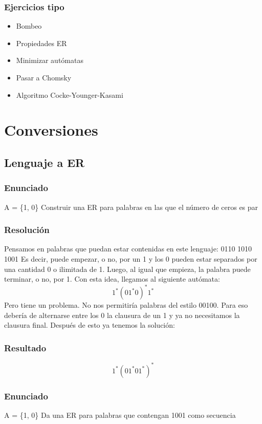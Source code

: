 \documentclass[12pt]{article}
\begin{document}
\subsubsection{Ejercicios tipo}
\begin{itemize}
    \item Bombeo
    \item Propiedades ER 
    \item Minimizar autómatas
    \item Pasar a Chomsky 
    \item Algoritmo Cocke-Younger-Kasami    
\end{itemize}
\newpage
\section{Conversiones}
\subsection{Lenguaje a ER}
\subsubsection{Enunciado}
A = \{1, 0\}
\newline
Construir una ER para palabras en las que el número de ceros es par
\subsubsection{Resolución}
Pensamos en palabras que puedan estar contenidas en este lenguaje: 
 0110 1010 1001 
\newline 
Es decir, puede empezar, o no, por un 1 y los 0 pueden estar separados por una cantidad 0 o ilimitada de 1. Luego, al igual que empieza, la palabra puede terminar, o no, por 1. Con esta idea, llegamos al siguiente autómata: 
\newline
\[1^*(01^*0)^*1^*\]
\newline
Pero tiene un problema. No nos permitiría palabras del estilo 00100. Para eso debería de alternarse entre los 0 la clausura de un 1 y ya no necesitamos la clausura final. Después de esto ya tenemos la solución: 
\subsubsection{Resultado}
\[1^*(01^*01^*)^*\]
\newpage
\subsubsection{Enunciado}
A = \{1, 0\}
\newline
Da una ER para palabras que contengan 1001 como secuencia
\end{document}

